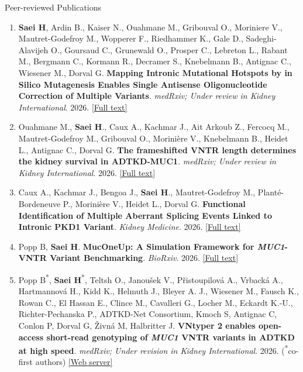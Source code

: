 \documentclass[
	11pt, %
]{resume} %
\begin{document}
\begin{rSection}{Peer-reviewed Publications}

\begin{enumerate}
  \item  \textbf{Saei H}, Ardin B., Kaiser N., Ouahmane M., Gribouval O., Moriniere V., Mautret-Godefroy M.,  Wopperer F.,  Riedhammer K., Gale D., Sadeghi-Alavijeh O., Goursaud C., Grunewald O., Prosper C., Lebreton L., Rabant M., Bergmann C., Kormann R., Decramer S., Knebelmann B., Antignac C.,  Wiesener M., Dorval G.
  \textbf{Mapping Intronic Mutational Hotspots by in Silico Mutagenesis Enables Single Antisense Oligonucleotide Correction of Multiple Variants}. 
  \textit{medRxiv; Under review in Kidney International}. 2026. \href{https://www.medrxiv.org/content/10.64898/2026.09.10.26362533v1}{[Full text]}

  \item  Ouahmane M., \textbf{Saei H}., Caux A., Kachmar J., Ait Arkoub Z., Fercocq M., Mautret-Godefroy M., Gribouval O., Morinière V., Knebelmann B., Heidet L., Antignac C., Dorval G.
  \textbf{The frameshifted VNTR length determines the kidney survival in ADTKD-MUC1}.
  \textit{medRxiv; Under review in Kidney International}. 2026. \href{https://www.medrxiv.org/content/10.64898/2026.10.28.26365901v1}{[Full text]}

  \item  Caux A., Kachmar J., Bengoa J., \textbf{Saei H}., Mautret-Godefroy M., Planté-Bordeneuve P., Morinière V.,  Heidet L., Dorval G.
  \textbf{Functional Identification of Multiple Aberrant Splicing Events Linked to Intronic PKD1 Variant}. 
  \textit{Kidney Medicine}. 2026. \href{https://www.kidneymedicinejournal.org/article/S2590-0595(26)00311-0/fulltext}{[Full text]}

  \item  Popp B, \textbf{Saei H}.
  \textbf{MucOneUp: A Simulation Framework for \textit{MUC1}-VNTR Variant Benchmarking}. 
  \textit{BioRxiv}. 2026. \href{https://www.biorxiv.org/content/10.64898/2026.05.08.723876v1}{[Full text]}

  \item Popp B\textsuperscript{*}, \textbf{Saei H}\textsuperscript{*}, Teltsh O., Janoušek V., Přistoupilová A., Vrbacká A., Hartmannová H., Kidd K., Helmuth J., Bleyer A. J., Wiesener M., Fausch K., Rowan C., El Hassan E., Clince M., Cavalleri G., Locher M., Eckardt K.-U., Richter-Pechanska P., ADTKD-Net Consortium, Kmoch S, Antignac C, Conlon P, Dorval G, Živná M, Halbritter J.
  \textbf{VNtyper 2 enables open-access short-read genotyping of \textit{MUC1} VNTR variants in ADTKD at high speed}.  
  \textit{medRxiv; Under revision in Kidney International}. 2026. (\textsuperscript{*}co-first authors) \href{https://vntyper.org/}{[Web server]}
  

\end{enumerate}
\end{rSection}
\end{document}
